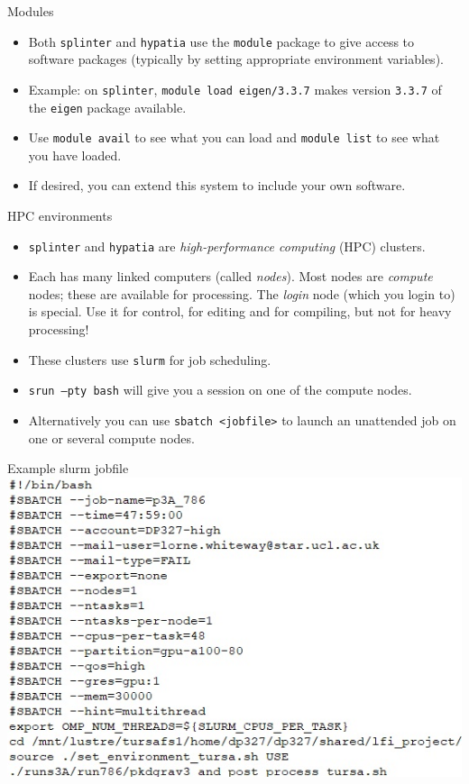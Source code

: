 \documentclass[dvipsnames]{beamer}
\newcommand{\command}[1]{\colorbox{light-gray}{\texttt{#1}}}
\newcommand{\server}[1]{\textcolor{BrickRed}{\texttt{#1}}}
\begin{document}
\begin{frame}{Modules}
\begin{itemize}
\item Both \server{splinter} and \server{hypatia} use the \command{module} package to give access to software packages (typically by setting appropriate environment variables).
\item Example: on \server{splinter}, \command{module load eigen/3.3.7} makes version \texttt{3.3.7} of the \command{eigen} package available.
\item Use \command{module avail} to see what you can load and \command{module list} to see what you have loaded.
\item If desired, you can extend this system to include your own software.
\end{itemize}
\end{frame}


\begin{frame}{HPC environments}
\begin{itemize}
\item \server{splinter} and \server{hypatia} are \textit{high-performance computing} (HPC) clusters.
\item Each has many linked computers (called \textit{nodes}). Most nodes are \textit{compute} nodes; these are available for processing. The \textit{login} node (which you login to) is special. Use it for control, for editing and for compiling, but not for heavy processing!
\item These clusters use \command{slurm} for job scheduling.
\item \command{srun --pty bash} will give you a session on one of the compute nodes.
\item Alternatively you can use \command{sbatch <jobfile>} to launch an unattended job on one or several compute nodes.
\end{itemize}
\end{frame}

\begin{frame}{Example slurm jobfile}
  \includegraphics[scale=0.8]{slurm_jobfile.jpg}
\end{frame}
\end{document}
